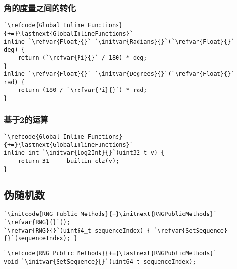 \subsubsection*{角的度量之间的转化}
\begin{lstlisting}
`\refcode{Global Inline Functions}{+=}\lastnext{GlobalInlineFunctions}`
inline `\refvar{Float}{}` `\initvar{Radians}{}`(`\refvar{Float}{}` deg) { 
    return (`\refvar{Pi}{}` / 180) * deg; 
}
inline `\refvar{Float}{}` `\initvar{Degrees}{}`(`\refvar{Float}{}` rad) { 
    return (180 / `\refvar{Pi}{}`) * rad; 
}
\end{lstlisting}

\subsubsection*{基于2的运算}
\begin{lstlisting}
`\refcode{Global Inline Functions}{+=}\lastnext{GlobalInlineFunctions}`
inline int `\initvar{Log2Int}{}`(uint32_t v) {
    return 31 - __builtin_clz(v);
}
\end{lstlisting}

\subsection{伪随机数}\label{sub:伪随机数}
{}
\begin{lstlisting}
`\initcode{RNG Public Methods}{=}\initnext{RNGPublicMethods}`
`\refvar{RNG}{}`();
`\refvar{RNG}{}`(uint64_t sequenceIndex) { `\refvar{SetSequence}{}`(sequenceIndex); }
\end{lstlisting}

\begin{lstlisting}
`\refcode{RNG Public Methods}{+=}\lastnext{RNGPublicMethods}`
void `\initvar{SetSequence}{}`(uint64_t sequenceIndex);
\end{lstlisting}